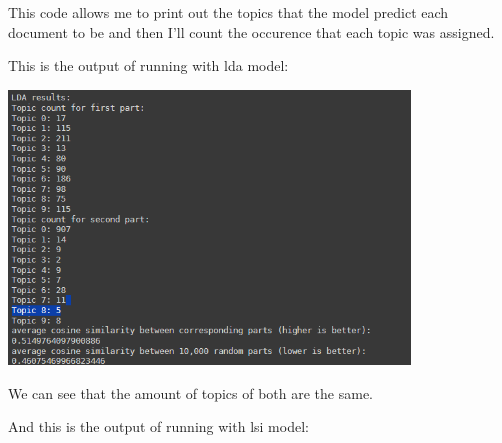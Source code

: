 \documentclass[a4paper]{article}
\begin{document}
This code allows me to print out the topics that the model predict each document
to be and then I'll count the occurence that each topic was assigned.

This is the output of running with lda model:

\includegraphics[width=0.8\textwidth]{../images/LDA.png}

We can see that the amount of topics of both are the same.

And this is the output of running with lsi model:
\end{document}
